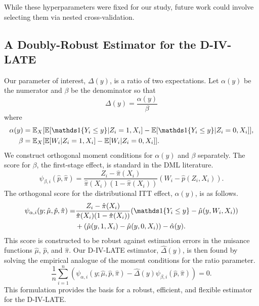 \documentclass[final,3p,fleqn, 10pt]{elsarticle}
\begin{document}
While these hyperparameters were fixed for our study, future work could involve selecting them via nested cross-validation.

\subsection{A Doubly-Robust Estimator for the D-IV-LATE}

Our parameter of interest, $\Delta(y)$, is a ratio of two expectations. Let $\alpha(y)$ be the numerator and $\beta$ be the denominator so that
$$ \Delta(y) = \frac{\alpha(y)}{\beta} $$
where
\begin{align*}
    \alpha(y) &= \mathbb{E}_{X}[\mathbb{E}[\ind\{Y_i \le y\} | Z_i=1, X_i] - \mathbb{E}[\ind\{Y_i \le y\} | Z_i=0, X_i]], \\
    \beta &= \mathbb{E}_{X}[\mathbb{E}[W_i | Z_i=1, X_i] - \mathbb{E}[W_i | Z_i=0, X_i]].
\end{align*}
We construct orthogonal moment conditions for $\alpha(y)$ and $\beta$ separately. The score for $\beta$, the first-stage effect, is standard in the DML literature.
\begin{equation} \label{eq:psi_beta}
\psi_{\beta, i}(\hat{p}, \hat{\pi}) = \frac{Z_i - \hat{\pi}(X_i)}{\hat{\pi}(X_i)(1-\hat{\pi}(X_i))} (W_i - \hat{p}(Z_i, X_i)).
\end{equation}
The orthogonal score for the distributional ITT effect, $\alpha(y)$, is as follows.
\begin{align} \label{eq:psi_alpha}
\psi_{\alpha, i}(y; \hat{\mu}, \hat{p}, \hat{\pi}) = & \frac{Z_i - \hat{\pi}(X_i)}{\hat{\pi}(X_i)(1-\hat{\pi}(X_i))} (\ind\{Y_i \le y\} - \hat{\mu}(y, W_i, X_i)) \nonumber \\
& + (\hat{\mu}(y, 1, X_i) - \hat{\mu}(y, 0, X_i)) - \hat{\alpha}(y).
\end{align}
This score is constructed to be robust against estimation errors in the nuisance functions $\hat{\mu}$, $\hat{p}$, and $\hat{\pi}$. Our D-IV-LATE estimator, $\hat{\Delta}(y)$, is then found by solving the empirical analogue of the moment conditions for the ratio parameter.
\begin{equation} \label{eq:moment_condition_ratio}
    \frac{1}{n} \sum_{i=1}^n \left( \psi_{\alpha, i}(y; \hat{\mu}, \hat{p}, \hat{\pi}) - \hat{\Delta}(y) \psi_{\beta, i}(\hat{p}, \hat{\pi}) \right) = 0.
\end{equation}
This formulation provides the basis for a robust, efficient, and flexible estimator for the D-IV-LATE.
\end{document}
